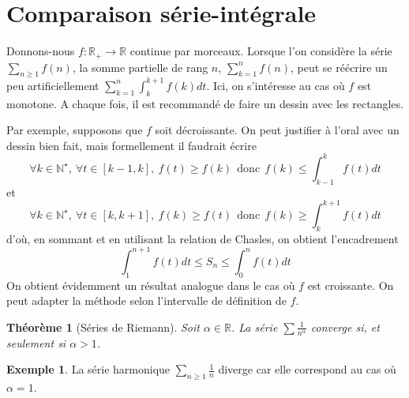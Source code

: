 \documentclass[french]{book}
\newcommand{\N}{\mathbb{N}}
\newcommand{\R}{\mathbb{R}}
\newcommand{\st}{^\star}
\theoremstyle{plain}
\newtheorem{thm}{Théorème}[chapter]
\theoremstyle{definition}
\newtheorem{exa}{Exemple}[chapter]
\theoremstyle{remark}
\begin{document}
\section{Comparaison série-intégrale}
Donnons-nous $f:\R_+\rightarrow\R$ continue par morceaux. Lorsque l'on considère la série $\displaystyle \sum_{n\geqslant 1}f(n)$, la somme partielle de rang $n$, $\displaystyle \sum_{k=1}^{n}f(n)$, peut se réécrire un peu artificiellement $\displaystyle \sum_{k=1}^{n}\int_{k}^{k+1}f(k)dt$. Ici, on s'intéresse au cas où $f$ est monotone. A chaque fois, il est recommandé de faire un dessin avec les rectangles. \\ \par Par exemple, supposons que $f$ soit décroissante. On peut justifier à l'oral avec un dessin bien fait, mais formellement il faudrait écrire $$\forall k\in\N\st,\ \forall t\in[k-1,k],\ f(t)\geqslant f(k) \ \ \text{donc} \ \ f(k)\leqslant\int_{k-1}^{k}f(t)dt$$ et $$\forall k\in\N\st,\ \forall t\in[k,k+1],\ f(k)\geqslant f(t) \ \ \text{donc} \ \ f(k)\geqslant\int_{k}^{k+1}f(t)dt$$ d'où, en sommant et en utilisant la relation de Chasles, on obtient l'encadrement $$\int_{1}^{n+1}f(t)dt\leqslant S_n\leqslant\int_{0}^{n}f(t)dt$$ On obtient évidemment un résultat analogue dans le cas où $f$ est croissante. On peut adapter la méthode selon l'intervalle de définition de $f$.

\begin{thm}[Séries de Riemann]
	Soit $\alpha\in\R$. La série $\displaystyle \sum \frac{1}{n^\alpha}$ converge si, et seulement si $\alpha>1$.
\end{thm}
\begin{exa}
	La série harmonique $\displaystyle \sum_{n\geqslant 1} \frac{1}{n}$ diverge car elle correspond au cas où $\alpha=1$.
\end{exa}
\end{document}
